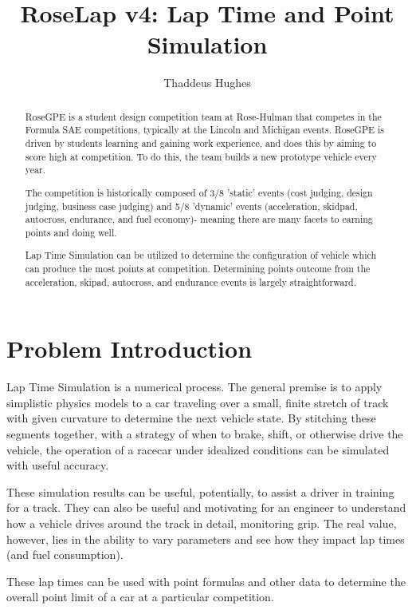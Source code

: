 \documentclass{article}
\begin{document}
\title{RoseLap v4: Lap Time and Point Simulation}
\author{Thaddeus Hughes}

\maketitle

\begin{abstract}
RoseGPE is a student design competition team at Rose-Hulman that competes in the Formula SAE competitions, typically at the Lincoln and Michigan events. RoseGPE is driven by students learning and gaining work experience, and does this by aiming to score high at competition. To do this, the team builds a new prototype vehicle every year.

The competition is historically composed of 3/8 'static' events (cost judging, design judging, business case judging) and 5/8 'dynamic' events (acceleration, skidpad, autocross, endurance, and fuel economy)- meaning there are many facets to earning points and doing well.

Lap Time Simulation can be utilized to determine the configuration of vehicle which can produce the most points at competition. Determining points outcome from the acceleration, skipad, autocross, and endurance events is largely straightforward.
\end{abstract}

\section{Problem Introduction}
Lap Time Simulation is a numerical process. The general premise is to apply simplistic physics models to a car traveling over a small, finite stretch of track with given curvature to determine the next vehicle state. By stitching these segments together, with a strategy of when to brake, shift, or otherwise drive the vehicle, the operation of a racecar under idealized conditions can be simulated with useful accuracy.

These simulation results can be useful, potentially, to assist a driver in training for a track. They can also be useful and motivating for an engineer to understand how a vehicle drives around the track in detail, monitoring grip. The real value, however, lies in the ability to vary parameters and see how they impact lap times (and fuel consumption).

These lap times can be used with point formulas and other data to determine the overall point limit of a car at a particular competition.
\end{document}
